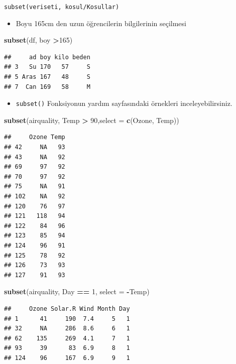 \documentclass[
  oneside]{book}
\newenvironment{Shaded}{\begin{snugshade}}{\end{snugshade}}
\newcommand{\AttributeTok}[1]{\textcolor[rgb]{0.13,0.29,0.53}{#1}}
\newcommand{\DecValTok}[1]{\textcolor[rgb]{0.00,0.00,0.81}{#1}}
\newcommand{\FunctionTok}[1]{\textcolor[rgb]{0.13,0.29,0.53}{\textbf{#1}}}
\newcommand{\NormalTok}[1]{#1}
\newcommand{\SpecialCharTok}[1]{\textcolor[rgb]{0.81,0.36,0.00}{\textbf{#1}}}
\providecommand{\tightlist}{%
  \setlength{\itemsep}{0pt}\setlength{\parskip}{0pt}}
\begin{document}
\texttt{subset(veriseti,\ kosul/Kosullar)}

\begin{itemize}
\tightlist
\item
  Boyu 165cm den uzun öğrencilerin bilgilerinin seçilmesi
\end{itemize}

\begin{Shaded}
\begin{Highlighting}[]
\FunctionTok{subset}\NormalTok{(df, boy }\SpecialCharTok{\textgreater{}}\DecValTok{165}\NormalTok{)}
\end{Highlighting}
\end{Shaded}

\begin{verbatim}
##     ad boy kilo beden
## 3   Su 170   57     S
## 5 Aras 167   48     S
## 7  Can 169   58     M
\end{verbatim}

\begin{itemize}
\tightlist
\item
  \texttt{subset()} Fonksiyonun yardım sayfasındaki örnekleri inceleyebilirsiniz.
\end{itemize}

\begin{Shaded}
\begin{Highlighting}[]
\FunctionTok{subset}\NormalTok{(airquality, Temp }\SpecialCharTok{\textgreater{}} \DecValTok{90}\NormalTok{,}\AttributeTok{select =} \FunctionTok{c}\NormalTok{(Ozone, Temp))}
\end{Highlighting}
\end{Shaded}

\begin{verbatim}
##     Ozone Temp
## 42     NA   93
## 43     NA   92
## 69     97   92
## 70     97   92
## 75     NA   91
## 102    NA   92
## 120    76   97
## 121   118   94
## 122    84   96
## 123    85   94
## 124    96   91
## 125    78   92
## 126    73   93
## 127    91   93
\end{verbatim}

\begin{Shaded}
\begin{Highlighting}[]
\FunctionTok{subset}\NormalTok{(airquality, Day }\SpecialCharTok{==} \DecValTok{1}\NormalTok{, }\AttributeTok{select =} \SpecialCharTok{{-}}\NormalTok{Temp)}
\end{Highlighting}
\end{Shaded}

\begin{verbatim}
##     Ozone Solar.R Wind Month Day
## 1      41     190  7.4     5   1
## 32     NA     286  8.6     6   1
## 62    135     269  4.1     7   1
## 93     39      83  6.9     8   1
## 124    96     167  6.9     9   1
\end{verbatim}
\end{document}
